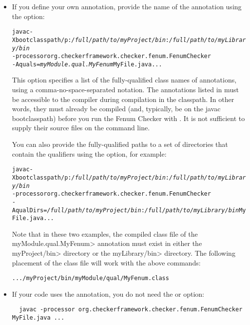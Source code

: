 \begin{itemize}
  \item
If you define your own annotation, provide the name of the annotation using the
 option:

\begin{alltt}
  javac -Xbootclasspath/p:\textit{/full/path/to/myProject/bin}:\textit{/full/path/to/myLibrary/bin} \ttbs
        -processor org.checkerframework.checker.fenum.FenumChecker \ttbs
        -Aquals=\textit{myModule.qual.MyFenum} MyFile.java ...
\end{alltt}

This option specifies a list of the fully-qualified class names of annotations,
using a comma-no-space-separated notation. The annotations listed in
 must be accessible to the compiler during compilation in the
classpath. In other words, they must already be compiled (and, typically, be on
the javac bootclasspath) before you run the Fenum Checker with . It
is not sufficient to supply their source files on the command line.

You can also provide the fully-qualified paths to a set of directories
that contain the qualifiers using the  option, for example:

\begin{alltt}
  javac -Xbootclasspath/p:\textit{/full/path/to/myProject/bin}:\textit{/full/path/to/myLibrary/bin} \ttbs
        -processor org.checkerframework.checker.fenum.FenumChecker \ttbs
        -AqualDirs=\textit{/full/path/to/myProject/bin}:\textit{/full/path/to/myLibrary/bin} MyFile.java ...
\end{alltt}

Note that in these two examples, the compiled class file of the
\<myModule.qual.MyFenum> annotation must exist in either the \<myProject/bin>
directory or the \<myLibrary/bin> directory. The following placement of
the class file will work with the above commands:

\begin{alltt}
  .../myProject/bin/myModule/qual/MyFenum.class
\end{alltt}

\item
If your code uses the  annotation, you do
not need the  or  option:

\begin{Verbatim}
  javac -processor org.checkerframework.checker.fenum.FenumChecker MyFile.java ...
\end{Verbatim}

\end{itemize}



